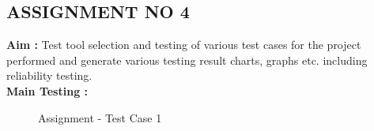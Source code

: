 \documentclass[oneside,a4paper,12pt]{report}
\begin{document}
{\begin{appendices}
\pagebreak

\section{ASSIGNMENT NO 4}

\textbf{Aim : } Test tool selection and testing of various test cases for the project performed and generate various testing result charts, graphs etc. including reliability testing. \\

\noindent \textbf{Main Testing : }

\begin{center}
	\begin{figure}[!htbp]
		\centering
	  \caption{Assignment - Test Case 1}
	  \label{fig:usecase}
	\end{figure}
\end{center}  


\end{appendices}}
\end{document}
